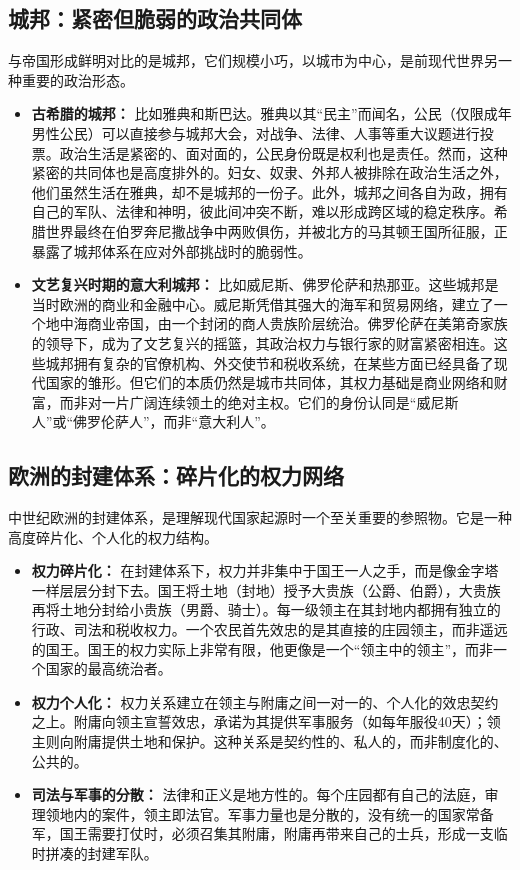 \subsection{城邦：紧密但脆弱的政治共同体}

与帝国形成鲜明对比的是城邦，它们规模小巧，以城市为中心，是前现代世界另一种重要的政治形态。

\begin{itemize}
    \item \textbf{古希腊的城邦：} 比如雅典和斯巴达。雅典以其“民主”而闻名，公民（仅限成年男性公民）可以直接参与城邦大会，对战争、法律、人事等重大议题进行投票。政治生活是紧密的、面对面的，公民身份既是权利也是责任。然而，这种紧密的共同体也是高度排外的。妇女、奴隶、外邦人被排除在政治生活之外，他们虽然生活在雅典，却不是城邦的一份子。此外，城邦之间各自为政，拥有自己的军队、法律和神明，彼此间冲突不断，难以形成跨区域的稳定秩序。希腊世界最终在伯罗奔尼撒战争中两败俱伤，并被北方的马其顿王国所征服，正暴露了城邦体系在应对外部挑战时的脆弱性。
    \item \textbf{文艺复兴时期的意大利城邦：} 比如威尼斯、佛罗伦萨和热那亚。这些城邦是当时欧洲的商业和金融中心。威尼斯凭借其强大的海军和贸易网络，建立了一个地中海商业帝国，由一个封闭的商人贵族阶层统治。佛罗伦萨在美第奇家族的领导下，成为了文艺复兴的摇篮，其政治权力与银行家的财富紧密相连。这些城邦拥有复杂的官僚机构、外交使节和税收系统，在某些方面已经具备了现代国家的雏形。但它们的本质仍然是城市共同体，其权力基础是商业网络和财富，而非对一片广阔连续领土的绝对主权。它们的身份认同是“威尼斯人”或“佛罗伦萨人”，而非“意大利人”。
\end{itemize}

\subsection{欧洲的封建体系：碎片化的权力网络}

中世纪欧洲的封建体系，是理解现代国家起源时一个至关重要的参照物。它是一种高度碎片化、个人化的权力结构。

\begin{itemize}
    \item \textbf{权力碎片化：} 在封建体系下，权力并非集中于国王一人之手，而是像金字塔一样层层分封下去。国王将土地（封地）授予大贵族（公爵、伯爵），大贵族再将土地分封给小贵族（男爵、骑士）。每一级领主在其封地内都拥有独立的行政、司法和税收权力。一个农民首先效忠的是其直接的庄园领主，而非遥远的国王。国王的权力实际上非常有限，他更像是一个“领主中的领主”，而非一个国家的最高统治者。
    \item \textbf{权力个人化：} 权力关系建立在领主与附庸之间一对一的、个人化的效忠契约之上。附庸向领主宣誓效忠，承诺为其提供军事服务（如每年服役40天）；领主则向附庸提供土地和保护。这种关系是契约性的、私人的，而非制度化的、公共的。
    \item \textbf{司法与军事的分散：} 法律和正义是地方性的。每个庄园都有自己的法庭，审理领地内的案件，领主即法官。军事力量也是分散的，没有统一的国家常备军，国王需要打仗时，必须召集其附庸，附庸再带来自己的士兵，形成一支临时拼凑的封建军队。
\end{itemize}

